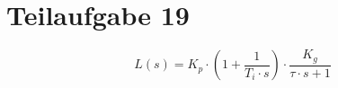 \section{Teilaufgabe 19}
\[ L(s) = K_p \cdot \left(1 + \frac{1}{T_i \cdot s}\right) 
    \cdot \frac{K_g}{\tau \cdot s + 1}
\]
